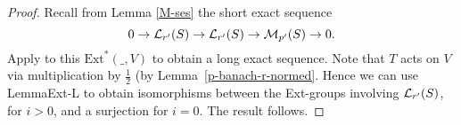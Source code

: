 \begin{proof}
  Recall from Lemma \ref{M-ses} the short exact sequence
  \[ 0 \to \mathcal L_{r'}(S) \to \mathcal L_{r'}(S) \to \mathcal M_{p'}(S) \to 0. \]
  Apply to this $\text{Ext}^*(\_, V)$ to obtain a long exact sequence.
  Note that $T$ acts on $V$ via multiplication by $\tfrac12$ (by Lemma~\ref{p-banach-r-normed}.
  Hence we can use Lemma{Ext-L} to obtain isomorphisms between the Ext-groups involving $\mathcal L_{r'}(S)$, for $i > 0$,
  and a surjection for $i = 0$.
  The result follows.
\end{proof}

